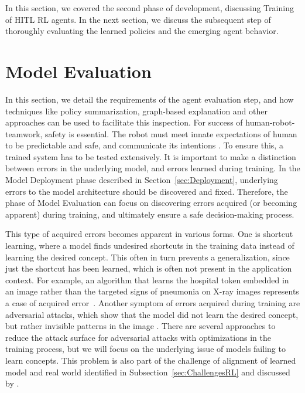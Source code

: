\documentclass[twoside,11pt]{article}
\begin{document}
In this section, we covered the second phase of development, discussing Training of HITL RL agents. In the next section, we discuss the subsequent step of thoroughly evaluating the learned policies and the emerging agent behavior. 

\section{Model Evaluation}
\label{sec:Evaluation}

In this section, we detail the requirements of the agent evaluation step, and how techniques like policy summarization, graph-based explanation and other approaches can be used to facilitate this inspection.
For success of human-robot-teamwork, safety is essential. The robot must meet innate expectations of human to be predictable and safe, and communicate its intentions \citep{EderHarperLeonards:2014:HITLRoboticsSafetyAssurance}. To ensure this, a trained system has to be tested extensively. It is important to make a distinction between errors in the underlying model, and errors learned during training. In the Model Deployment phase described in Section~\ref{sec:Deployment}, underlying errors to the model architecture should be discovered and fixed. Therefore, the phase of Model Evaluation can focus on discovering errors acquired (or becoming apparent) during training, and ultimately ensure a safe decision-making process.

This type of acquired errors becomes apparent in various forms. One is shortcut learning, where a model finds undesired shortcuts in the training data instead of learning the desired concept. This often in turn prevents a generalization, since just the shortcut has been learned, which is often not present in the application context. For example, an algorithm that learns the hospital token embedded in an image rather than the targeted signs of pneumonia on X-ray images represents a case of acquired error~\citep{GeirhosEtAl:2020:ShortcutLearningDNN}. 
Another symptom of errors acquired during training are adversarial attacks, which show that the model did not learn the desired concept, but rather invisible patterns in the image \citep{GoodfellowShlensSzegedy:2014:AdversarialExamples}. There are several approaches to reduce the attack surface for adversarial attacks with optimizations in the training process, but we will focus on the underlying issue of models failing to learn concepts. This problem is also part of the challenge of alignment of learned model and real world identified in Subsection~\ref{sec:ChallengesRL} and discussed by \citet{RoyEtAl:2021:RLRoboticsChallenges}.
\end{document}
